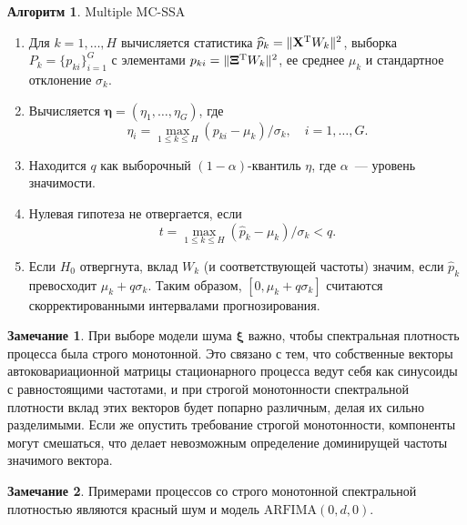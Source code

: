 \documentclass[specialist,
substylefile = spbu_report.rtx,
subf,href,colorlinks=true, 12pt]{disser}
\theoremstyle{definition}
\newtheorem{algorithm}{Алгоритм}
\newtheorem{remark}{Замечание}[section]
\begin{document}
\begin{algorithm}{Multiple MC-SSA~\cite{Golyandina2023}}\label{alg:multiple_mc-ssa}
	\begin{enumerate}
		\item Для $k=1,\dots,H$ вычисляется статистика $\widehat{p}_k=\|\mathbf{X}^{\mathrm{T}} W_k\|^2$, выборка $P_k=\{p_{ki}\}_{i=1}^G$ с элементами $p_{ki}=\|\bm\Xi^{\mathrm{T}} W_k\|^2$, ее среднее $\mu_k$ и стандартное отклонение $\sigma_k$.
		\item Вычисляется $\mathbf{\eta}=(\eta_1,\dots,\eta_G)$, где
		      \[
			      \eta_i=\max_{1\leqslant k\leqslant H}(p_{ki}-\mu_k)/\sigma_k,\quad i=1,\dots,G.
		      \]
		\item Находится $q$ как выборочный $(1-\alpha)$-квантиль $\eta$, где $\alpha$~--- уровень значимости.
		\item Нулевая гипотеза не отвергается, если
		      \[
			      t = \max_{1\leqslant k\leqslant H}(\widehat{p}_k-\mu_k)/\sigma_k<q.
		      \]
		\item Если $H_0$ отвергнута, вклад $W_k$ (и соответствующей частоты) значим, если $\widehat{p}_k$ превосходит $\mu_k+q\sigma_k$. Таким образом, $[0,\mu_k+q\sigma_k]$ считаются скорректированными интервалами прогнозирования.
	\end{enumerate}
\end{algorithm}

\begin{remark}
	При выборе модели шума $\bm\xi$ важно, чтобы спектральная плотность процесса была строго монотонной. Это связано с тем, что собственные векторы автоковариационной матрицы стационарного процесса ведут себя как синусоиды с равностоящими частотами, и при строгой монотонности спектральной плотности вклад этих векторов будет попарно различным, делая их сильно разделимыми. Если же опустить требование строгой монотонности, компоненты могут смешаться, что делает невозможным определение доминирущей частоты значимого вектора.
\end{remark}
\begin{remark}
	Примерами процессов со строго монотонной спектральной плотностью являются красный шум и модель $\mathrm{ARFIMA}(0, d, 0)$.
\end{remark}
\end{document}
